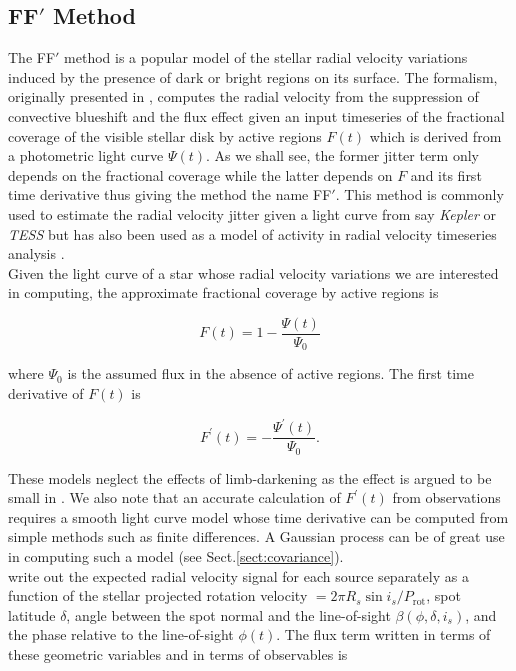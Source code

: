 \subsection{FF$\mathbf{'}$ Method} \label{sect:ffprime}
The FF$'$ method is a popular model of the stellar radial velocity variations induced by the 
presence of dark or bright regions on its surface. The formalism, originally presented in \cite{aigrain12}, 
computes the radial velocity from the suppression of convective blueshift and the 
flux effect given 
an input timeseries of the fractional coverage of the visible stellar disk by active regions $F(t)$ 
which is derived from a photometric light curve $\Psi(t)$. 
As we shall see, the former jitter 
term only depends on the fractional coverage while the latter depends on 
$F$ and its first time derivative thus giving the method the name FF$'$. This method is commonly 
used to estimate the radial velocity jitter given a light curve from say \emph{Kepler} or \emph{TESS} 
but has also been used as a model of activity in radial velocity timeseries analysis 
\parencite[e.g.][]{haywood14}. \\

Given the light curve of a star whose radial velocity variations we are interested in 
computing, the approximate fractional coverage by active regions is 

\begin{equation}
F(t) = 1 - \frac{\Psi(t)}{\Psi_0} \label{eq:fractionalcoverage}
\end{equation}

\noindent where $\Psi_0$ is the assumed flux in the absence of active regions. 
The first time derivative 
of $F(t)$ is 

\begin{equation}
F^{'}(t) = -\frac{\Psi^{'}(t)}{\Psi_0}.
\end{equation}

\noindent These models neglect the effects of limb-darkening as the effect is argued to be small 
in \cite{aigrain12}. 
We also note that an accurate calculation of $F^{'}(t)$ from observations 
requires a smooth light curve model 
whose time derivative can be computed from simple methods such as finite differences. A Gaussian 
process can be of great use in computing such a model (see Sect.\ref{sect:covariance}). \\

\cite{aigrain12} write out the expected radial velocity signal for each source separately as a function of the stellar 
projected rotation velocity \vsini{} $=2 \pi R_s \sin{i_s} / P_{\mathrm{rot}}$, spot latitude $\delta$, 
angle between the spot normal and the 
line-of-sight $\beta(\phi,\delta,i_s)$, and the phase relative to the line-of-sight $\phi(t)$. 
The flux term written in terms of these geometric variables and in terms of observables is  

